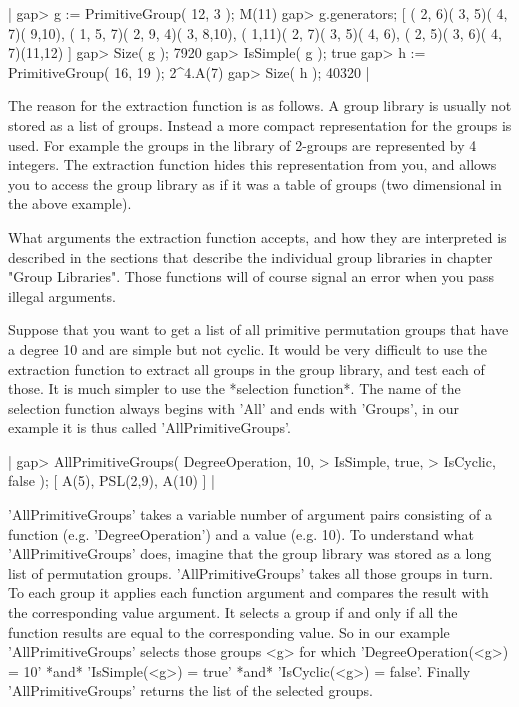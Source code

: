 |    gap> g := PrimitiveGroup( 12, 3 );
    M(11)
    gap> g.generators;
    [ ( 2, 6)( 3, 5)( 4, 7)( 9,10), ( 1, 5, 7)( 2, 9, 4)( 3, 8,10),
      ( 1,11)( 2, 7)( 3, 5)( 4, 6), ( 2, 5)( 3, 6)( 4, 7)(11,12) ]
    gap> Size( g );
    7920
    gap> IsSimple( g );
    true
    gap> h := PrimitiveGroup( 16, 19 );
    2^4.A(7)
    gap> Size( h );
    40320 |

The reason for the extraction function is as follows.  A group library is
usually  not  stored  as  a  list  of  groups.   Instead a  more  compact
representation for  the groups is used.   For  example  the groups in the
library  of  2-groups are  represented  by 4  integers.   The  extraction
function hides this representation from you, and allows you to access the
group library  as  if it was  a  table of groups  (two dimensional in the
above example).

What  arguments  the  extraction  function  accepts,  and  how  they  are
interpreted  is described in  the  sections that describe the  individual
group libraries in chapter  "Group  Libraries".  Those  functions will of
course signal an error when you pass illegal arguments.

Suppose that  you want to get a list of  all primitive permutation groups
that have  a degree  10 and are simple  but not cyclic.  It would be very
difficult  to use the extraction  function to extract  all groups in  the
group library,  and  test each  of those.  It is much simpler to  use the
*selection  function*.   The name of the selection function always begins
with  'All' and ends with  'Groups', in our  example  it  is  thus called
'AllPrimitiveGroups'.

|    gap> AllPrimitiveGroups( DegreeOperation,   10,
    >                        IsSimple,          true,
    >                        IsCyclic,          false );
    [ A(5), PSL(2,9), A(10) ] |

'AllPrimitiveGroups' takes a variable number of argument pairs consisting
of a  function  (e.g.  'DegreeOperation') and  a value  (e.g.   10).   To
understand what 'AllPrimitiveGroups' does, imagine that the group library
was stored  as a long list  of permutation groups.   'AllPrimitiveGroups'
takes all those groups  in  turn.  To each group it applies each function
argument and compares the result  with the corresponding value  argument.
It selects a group if and  only  if all the function results are equal to
the corresponding value.  So in our  example 'AllPrimitiveGroups' selects
those  groups  <g>   for   which  'DegreeOperation(<g>)   =   10'   *and*
'IsSimple(<g>)  =  true'   *and*   'IsCyclic(<g>)   =   false'.   Finally
'AllPrimitiveGroups' returns the list of the selected groups.

